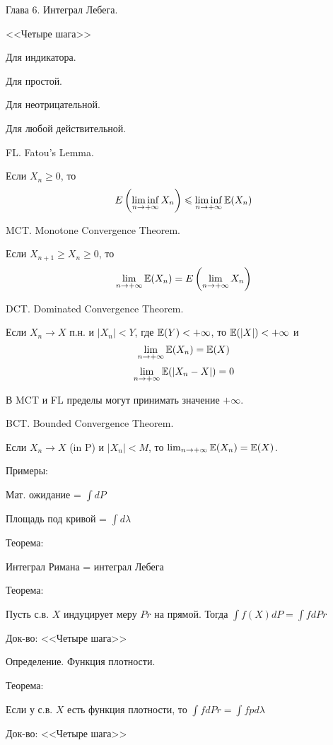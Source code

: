 {Глава 6. Интеграл Лебега. \par

<<Четыре шага>> \par
Для индикатора. \par
Для простой. \par
Для неотрицательной. \par
Для любой действительной. \par

FL. Fatou's Lemma. \par
Если $X_{n}\ge 0$, то
$$
E\left(\liminf_{n\rightarrow +\infty}X_{n}\right)\leqslant
\liminf_{n\rightarrow +\infty}\mathbb{E}(X_{n})
$$

MCT. Monotone Convergence Theorem. \par
Если $X_{n+1} \ge X_{n} \ge 0$, то
$$
\lim_{n\rightarrow +\infty}\mathbb{E}(X_{n})=E\left(\lim_{n\rightarrow
+\infty}X_{n}\right)
$$

DCT. Dominated Convergence Theorem. \par
Если $X_{n}\rightarrow X$ п.н. и $|X_{n}|<Y$, где $\mathbb{E}(Y)<+\infty$,
то $\mathbb{E}(|X|)<+\infty$ и
$$ \lim_{n\rightarrow +\infty}\mathbb{E}(X_{n})=\mathbb{E}(X) $$
$$ \lim_{n\rightarrow+\infty}\mathbb{E}(|X_{n}-X|)=0 $$

В MCT и FL пределы могут принимать значение $+\infty$. \par

BCT. Bounded Convergence Theorem. \par
Если $X_{n}\rightarrow X$ (in P) и $|X_{n}|<M$, то
$\lim_{n\rightarrow +\infty}\mathbb{E}(X_{n})=\mathbb{E}(X)$. \par


Примеры: \par
Мат. ожидание = $\int dP$ \par
Площадь под кривой = $\int d\lambda$ \par

Теорема: \par
Интеграл Римана = интеграл Лебега \par

Теорема: \par
Пусть с.в. $X$ индуцирует меру $Pr$ на прямой. Тогда $\int f(X)dP=\int fdPr$ \par
Док-во: <<Четыре шага>> \par

Определение. Функция плотности. \par

Теорема: \par
Если у с.в. $X$ есть функция плотности, то $\int fdPr=\int fpd\lambda$ \par
Док-во: <<Четыре шага>> \par

}
